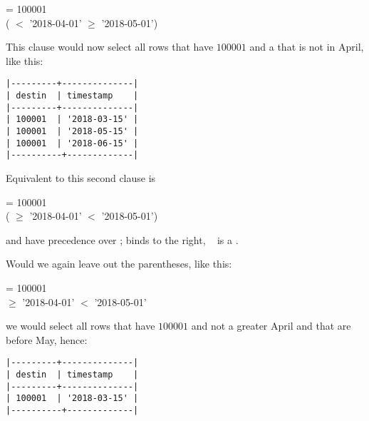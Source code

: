 \begin{minipage}{\textwidth}
  = 100001 \\
\hspace*{0.45cm} ( $<$ '2018-04-01'
  $\ge$ '2018-05-01')
\end{minipage}

This clause would now select all rows
that have  $100001$ and
a  that is not in April,
like this:

\begin{minipage}{\textwidth}
\begin{verbatim}
|---------+--------------|
| destin  | timestamp    |
|---------+--------------|
| 100001  | '2018-03-15' |
| 100001  | '2018-05-15' |
| 100001  | '2018-06-15' |
|----------+-------------|
\end{verbatim}
\end{minipage}

Equivalent to this second clause is

  = 100001 \\
\hspace*{0.45cm}  
( $\ge$ '2018-04-01'
  $<$ '2018-05-01')

 and  have precedence
over ;  binds to the right,
\ie\  is a .

Would we again leave out the parentheses,
like this:

  = 100001 \\
\hspace*{0.45cm}  
 $\ge$ '2018-04-01'
  $<$ '2018-05-01'

we would select all rows that have 
$100001$ and not a  greater April
and that are before May, hence:

\begin{minipage}{\textwidth}
\begin{verbatim}
|---------+--------------|
| destin  | timestamp    |
|---------+--------------|
| 100001  | '2018-03-15' |
|----------+-------------|
\end{verbatim}
\end{minipage}

